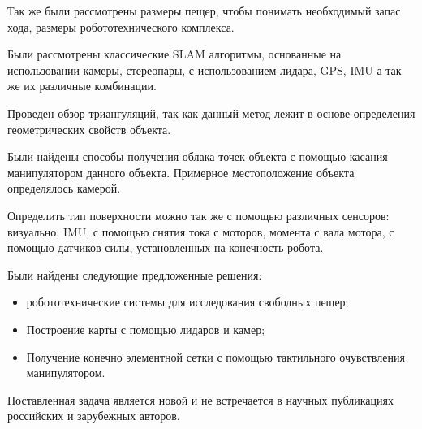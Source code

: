 Так же были рассмотрены размеры пещер, чтобы понимать необходимый запас хода, размеры робототехнического комплекса.

Были рассмотрены классические SLAM алгоритмы, основанные на использовании камеры, стереопары, с использованием лидара, GPS, IMU а так же их различные комбинации. 

Проведен обзор триангуляций, так как данный метод лежит в основе определения геометрических свойств объекта.

Были найдены способы получения облака точек объекта с помощью касания манипулятором данного объекта. Примерное местоположение объекта определялось камерой.

Определить тип поверхности можно так же с помощью различных сенсоров: визуально, IMU, с помощью снятия тока с моторов, момента с вала мотора, с помощью датчиков силы, установленных на конечность робота.

Были найдены следующие предложенные решения:
\begin{itemize}
    \item робототехнические системы для исследования свободных пещер;
    \item Построение карты с помощью лидаров и камер;
    \item Получение конечно элементной сетки с помощью тактильного очувствления манипулятором.
\end{itemize}

Поставленная задача является новой и не встречается в научных публикациях российских и зарубежных авторов.